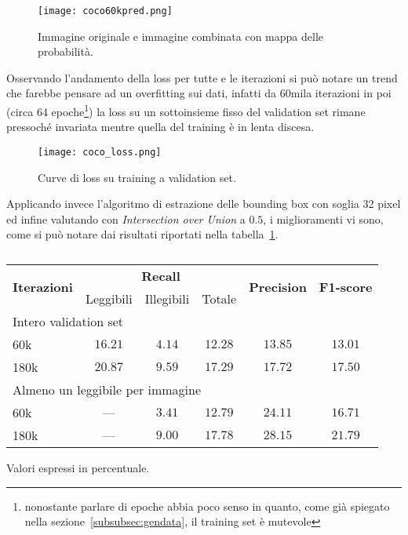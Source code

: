 \begin{figure}[H]
	\centering
	\texttt{[image: coco60kpred.png]}
	\caption{Immagine originale e immagine combinata con mappa delle probabilità.}
\label{fig:coco_example}
\end{figure}

Osservando l'andamento della loss per tutte e le iterazioni si può notare un trend che farebbe pensare ad un overfitting sui dati, infatti da 60mila iterazioni in poi (circa 64 epoche\footnote{nonostante parlare di epoche abbia poco senso in quanto, come già spiegato nella sezione~\ref{subsubsec:gendata}, il training set è mutevole}) la loss su un sottoinsieme fisso del validation set rimane pressoché invariata mentre quella del training è in lenta discesa.

\begin{figure}[H]
	\centering
	\texttt{[image: coco\_loss.png]}
	\caption{Curve di loss su training a validation set.}
\label{fig:coco_loss}
\end{figure}

Applicando invece l'algoritmo di estrazione delle bounding box con soglia 32 pixel ed infine valutando con \textit{Intersection over Union} a $0.5$, i miglioramenti vi sono, come si può notare dai risultati riportati nella tabella~\ref{tab:coco}.

\begin{table}[H]
\centering
\begin{threeparttable}
	\begin{tabular}{l*{5}c}
		\toprule
		\multirow{2}{*}{\textbf{Iterazioni}} & \multicolumn{3}{c}{\textbf{Recall}} & \multirow{2}{*}{\textbf{Precision}} & \multirow{2}{*}{\textbf{F1-score}} \\
		\cmidrule(lr){2-4}
		& Leggibili & Illegibili & Totale &  &  \\
		\midrule
		\multicolumn{6}{l}{Intero validation set} \\
		60k		& $16.21$ & $4.14$ & $12.28$ & $13.85$ & $13.01$ \\
		180k	& $20.87$ & $9.59$ & $17.29$ & $17.72$ & $17.50$ \\
		\midrule
		\multicolumn{6}{l}{Almeno un leggibile per immagine} \\
		60k		&   ---   & $3.41$ & $12.79$ & $24.11$ & $16.71$ \\
		180k	&   ---   & $9.00$ & $17.78$ & $28.15$ & $21.79$ \\
		\bottomrule
	\end{tabular}
	\begin{tablenotes}
		\item \footnotesize{Valori espressi in percentuale.}
	\end{tablenotes}
\end{threeparttable}
\caption{}\label{tab:coco}
\end{table}


